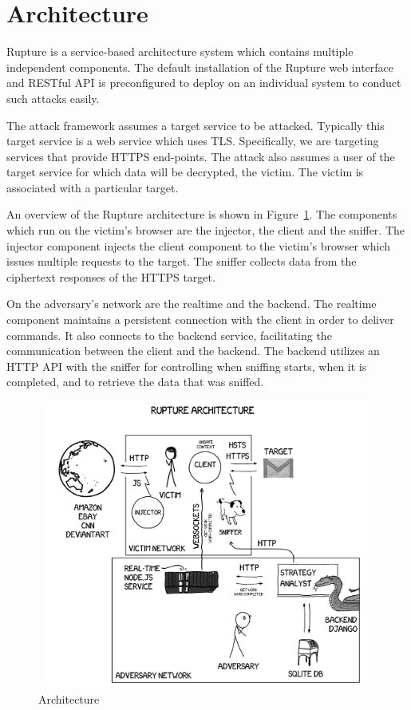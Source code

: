 \documentclass[a4paper, 11 pt, conference]{article}
\begin{document}
\section{Architecture}

Rupture is a service-based architecture system which contains multiple independent components. The default installation of the Rupture web interface and RESTful API is preconfigured to deploy on an individual system to conduct such attacks easily.

The attack framework assumes a target service to be attacked. Typically this target service is a web service which uses TLS. Specifically, we are targeting services that provide HTTPS end-points.
The attack also assumes a user of the target service for which data will be decrypted, the victim. The victim is associated with a particular target.

An overview of the Rupture architecture is shown in Figure~\ref{fig:architecture}.
The components which run on the victim's browser are the injector, the client and the sniffer. The injector component injects the client component to the victim's browser which issues multiple requests to the target. The sniffer collects data from the ciphertext responses of the HTTPS target.

On the adversary's network are the realtime and the backend. The realtime component maintains a persistent connection with the client in order to deliver commands. It also connects to the backend service, facilitating the communication between the client and the backend. The backend utilizes an HTTP API with the sniffer for controlling when sniffing starts, when it is completed, and to retrieve the data that was sniffed. 

\begin{figure}[thpb]
	\centering
	\includegraphics[width=120mm, height=95mm]{figures/architecture.png}
	\caption{Architecture}
	\label{fig:architecture}
\end{figure}
\end{document}
